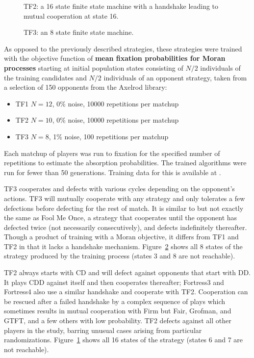 \documentclass{article}
\begin{document}
\begin{figure}[!hbtp]
    \centering
    
    \caption{TF2: a 16 state finite state machine with a handshake leading to
    mutual cooperation at state 16.}
    \label{fig:tf2}
\end{figure}


\begin{figure}[!hbtp]
    \centering
    
    \caption{TF3: an 8 state finite state machine.}
    \label{fig:tf3}
\end{figure}

As opposed to the previously described strategies, these strategies were trained
with the objective function of \textbf{mean fixation probabilities for Moran
processes} starting at initial population states consisting of \(N/2\)
individuals of the training candidates and \(N/2\) individuals of an opponent
strategy, taken from a selection of 150 opponents from the Axelrod library:

\begin{itemize}
	\item TF1 \(N=12\), 0\% noise, 10000 repetitions per matchup
	\item TF2 \(N=10\), 0\% noise, 10000 repetitions per matchup
	\item TF3 \(N=8\), 1\% noise, 100 repetitions per matchup
\end{itemize}

Each matchup of players was run to fixation for the specified number of
repetitions to estimate the absorption probabilities. The trained algorithms
were run for fewer than 50 generations. Training data for this is available at
\cite{data}.

TF3 cooperates and defects with
various cycles depending on the opponent's actions. TF3 will mutually
cooperate with any strategy and only tolerates a few defections before
defecting for the rest of match. It is similar to but not exactly the same as
Fool Me Once, a strategy that cooperates until the opponent has defected twice
(not necessarily consecutively), and defects indefinitely thereafter. Though a
product of training with a Moran objective, it differs from TF1 and TF2
in that it lacks a handshake mechanism. Figure~\ref{fig:tf3} shows
all 8 states of the strategy produced by the training process (states 3 and 8
are not reachable).

TF2 always starts with CD and will defect against opponents that start with
DD\@. It plays CDD against itself and then cooperates thereafter; Fortress3 and
Fortress4 also use a similar handshake and cooperate with TF2. Cooperation
can be rescued after a failed handshake by a complex sequence of plays
which sometimes results in mutual cooperation with Firm but Fair, Grofman, and
GTFT, and a few others with low probability. TF2 defects against all other
players in the study, barring
unusual cases arising from particular randomizations. Figure~\ref{fig:tf2} shows
all 16 states of the strategy (states 6 and 7 are not reachable).
\end{document}
